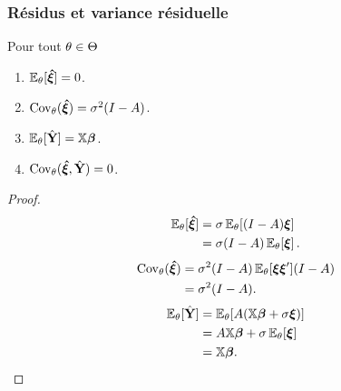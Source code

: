 \begin{frame}
\frametitle{Résidus et variance résiduelle}
\begin{theorem}
Pour tout $\theta \in \Theta$
\begin{enumerate}
\item  \alert<1>{$\operatorname{{\mathbb E}}_{\theta}[\boldsymbol{\hat{\xi}}] = 0$}.
\item  \alert<2>{$\mathrm{Cov}_{\theta}(\boldsymbol{\hat{\xi}})= \sigma^2 (I - A)$}.
\item  \alert<3>{$\operatorname{{\mathbb E}}_{\theta}[\hat{\mathbf{Y}}]= \mathbb{X} \boldsymbol{\beta}$}.
\item  \alert<4>{$\mathrm{Cov}_{\theta}(\boldsymbol{\hat{\xi}},\hat{\mathbf{Y}})= 0$}.
\end{enumerate}
\end{theorem}
\begin{proof}
 {
\begin{align*}
\operatorname{{\mathbb E}}_{\theta}[\boldsymbol{\hat{\xi}}] &= \sigma \operatorname{{\mathbb E}}_{\theta}[ (I-A) \boldsymbol{\xi}] \\
&= \sigma (I-A) \operatorname{{\mathbb E}}_{\theta}[\boldsymbol{\xi}] \,.
\end{align*}
}
 {
\begin{align*}
\mathrm{Cov}_{\theta}(\boldsymbol{\hat{\xi}})&= \sigma^2 (I-A) \operatorname{{\mathbb E}}_{\theta}[\boldsymbol{\xi} \boldsymbol{\xi}'] (I- A) \\
&= \sigma^2 (I-A).
\end{align*}
}
 {
\begin{align*}
\operatorname{{\mathbb E}}_{\theta}[\hat{\mathbf{Y}}] &= \operatorname{{\mathbb E}}_{\theta}[ A (\mathbb{X} \boldsymbol{\beta} + \sigma \boldsymbol{\xi})] \\
&=  A \mathbb{X} \boldsymbol{\beta} + \sigma \operatorname{{\mathbb E}}_{\theta}[ \boldsymbol{\xi}] \\
&= \mathbb{X} \boldsymbol{\beta}.
\end{align*}
}
\end{proof}
\end{frame}



